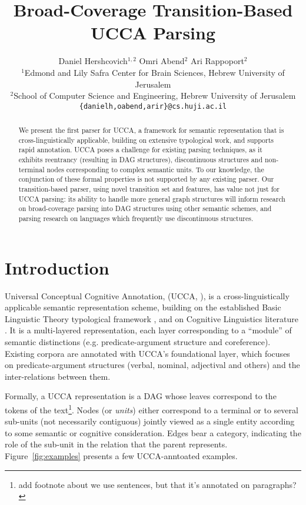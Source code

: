 \documentclass[11pt]{article}
\title{Broad-Coverage Transition-Based UCCA Parsing}
\author{Daniel Hershcovich$^{1,2}$ \And Omri Abend$^2$ \And Ari Rappoport$^2$ \\
  $^1$Edmond and Lily Safra Center for Brain Sciences, Hebrew University of Jerusalem \\
  $^2$School of Computer Science and Engineering, Hebrew University of Jerusalem \\
  \texttt{\{danielh,oabend,arir\}@cs.huji.ac.il}
}
\date{}
\newcommand{\oa}[1]{\footnote{\color{red} #1}}
\newcommand{\figref}[1]{Figure~\ref{#1}}
\begin{document}
\maketitle

\begin{abstract}
  We present the first parser for UCCA, a framework for semantic
  representation that is cross-linguistically applicable, building on extensive
  typological work, and supports rapid annotation.
  UCCA poses a challenge for existing parsing techniques,
  as it exhibits reentrancy (resulting in DAG structures),
  discontinuous structures and non-terminal nodes corresponding
  to complex semantic units. To our knowledge, the conjunction
  of these formal properties is not supported by any existing parser.
  Our transition-based parser, using novel transition set
  and features, has value not just for UCCA parsing:
  its ability to handle more general graph structures will inform
  research on broad-coverage parsing into DAG structures using
  other semantic schemes, 
  and parsing research on languages which frequently use discontinuous structures.
\end{abstract}


\section{Introduction}\label{sec:introduction}

Universal Conceptual Cognitive Annotation, (UCCA, ),
is a cross-linguistically applicable semantic representation scheme,
building on the established Basic Linguistic Theory typological framework
\cite{Dixon:10b,Dixon:10a,Dixon:12}, and on Cognitive
Linguistics literature \cite{Croft:04}.
It is a multi-layered representation, each layer corresponding
to a ``module'' of semantic distinctions
(e.g. predicate-argument structure and coreference). Existing corpora are
annotated with UCCA's foundational layer, which focuses on predicate-argument
structures (verbal, nominal, adjectival and others) and the inter-relations between them.

Formally, a UCCA representation is a DAG whose leaves correspond to the tokens of the text\oa{add footnote about we use sentences, but that it's annotated on paragraphs?}. Nodes (or {\it units}) either correspond to a terminal or
to several sub-units (not necessarily contiguous) jointly viewed as a
single entity according to some semantic or cognitive consideration.
Edges bear a category, indicating the role of the sub-unit in the relation
that the parent represents.
\figref{fig:examples} presents a few UCCA-anntoated examples.
\end{document}
